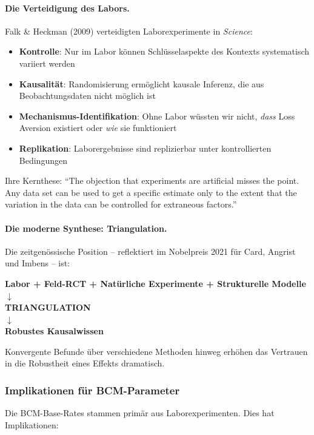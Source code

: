 \paragraph{Die Verteidigung des Labors.}
Falk \& Heckman (2009) verteidigten Laborexperimente in \textit{Science}:
\begin{itemize}
    \item \textbf{Kontrolle}: Nur im Labor können Schlüsselaspekte des Kontexts systematisch variiert werden
    \item \textbf{Kausalität}: Randomisierung ermöglicht kausale Inferenz, die aus Beobachtungsdaten nicht möglich ist
    \item \textbf{Mechanismus-Identifikation}: Ohne Labor wüssten wir nicht, \textit{dass} Loss Aversion existiert oder \textit{wie} sie funktioniert
    \item \textbf{Replikation}: Laborergebnisse sind replizierbar unter kontrollierten Bedingungen
\end{itemize}

Ihre Kernthese: ``The objection that experiments are artificial misses the point. Any data set can be used to get a specific estimate only to the extent that the variation in the data can be controlled for extraneous factors.''

\paragraph{Die moderne Synthese: Triangulation.}
Die zeitgenössische Position -- reflektiert im Nobelpreis 2021 für Card, Angrist und Imbens -- ist:

\begin{center}
\textbf{Labor + Feld-RCT + Natürliche Experimente + Strukturelle Modelle}\\[0.3em]
$\downarrow$\\[0.3em]
\textbf{TRIANGULATION}\\[0.3em]
$\downarrow$\\[0.3em]
\textbf{Robustes Kausalwissen}
\end{center}

Konvergente Befunde über verschiedene Methoden hinweg erhöhen das Vertrauen in die Robustheit eines Effekts dramatisch.

\subsubsection{Implikationen für BCM-Parameter}

Die BCM-Base-Rates stammen primär aus Laborexperimenten. Dies hat Implikationen:


